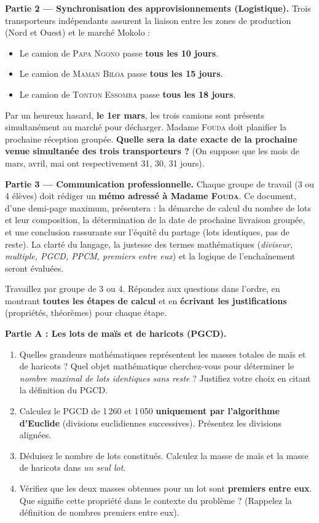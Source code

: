 \documentclass[11pt]{article}
\newcounter{popsec}
\newcounter{popsub}
\newcommand{\courssub}[1]{%
  \stepcounter{popsub}%
  \par\vspace{9pt}\noindent{\popxbold\fontsize{11.5}{13}\selectfont\color{popink}{\color{poporange}\thepopsec.\thepopsub}\hspace{6pt}#1}\par\nopagebreak\vspace{4pt}
}
\begin{document}
\medskip
\noindent \textbf{Partie 2 — Synchronisation des approvisionnements (Logistique).}
Trois transporteurs indépendants assurent la liaison entre les zones de production (Nord et Ouest) et le marché Mokolo :
\begin{itemize}
    \item Le camion de \textsc{Papa Ngono} passe \textbf{tous les 10 jours}.
    \item Le camion de \textsc{Maman Biloa} passe \textbf{tous les 15 jours}.
    \item Le camion de \textsc{Tonton Essomba} passe \textbf{tous les 18 jours}.
\end{itemize}
Par un heureux hasard, \textbf{le 1er mars}, les trois camions sont présents simultanément au marché pour décharger. Madame \textsc{Fouda} doit planifier la prochaine réception groupée. \textbf{Quelle sera la date exacte de la prochaine venue simultanée des trois transporteurs ?} (On suppose que les mois de mars, avril, mai ont respectivement 31, 30, 31 jours).

\medskip
\noindent \textbf{Partie 3 — Communication professionnelle.}
Chaque groupe de travail (3 ou 4 élèves) doit rédiger un \textbf{mémo adressé à Madame \textsc{Fouda}}. Ce document, d'une demi-page maximum, présentera : la démarche de calcul du nombre de lots et leur composition, la détermination de la date de prochaine livraison groupée, et une conclusion rassurante sur l'équité du partage (lots identiques, pas de reste). La clarté du langage, la justesse des termes mathématiques (\emph{diviseur, multiple, PGCD, PPCM, premiers entre eux}) et la logique de l'enchaînement seront évaluées.

\courssub{Consignes}
Travaillez par groupe de 3 ou 4. Répondez aux questions dans l'ordre, en montrant \textbf{toutes les étapes de calcul} et en \textbf{écrivant les justifications} (propriétés, théorèmes) pour chaque étape.

\medskip
\noindent \textbf{Partie A : Les lots de maïs et de haricots (PGCD).}
\begin{enumerate}
    \item Quelles grandeurs mathématiques représentent les masses totales de maïs et de haricots ? Quel objet mathématique cherchez-vous pour déterminer le \emph{nombre maximal de lots identiques sans reste} ? Justifiez votre choix en citant la définition du PGCD.
    \item Calculez le PGCD de 1\,260 et 1\,050 \textbf{uniquement par l'algorithme d'Euclide} (divisions euclidiennes successives). Présentez les divisions alignées.
    \item Déduisez le nombre de lots constitués. Calculez la masse de maïs et la masse de haricots dans \emph{un seul lot}.
    \item Vérifiez que les deux masses obtenues pour un lot sont \textbf{premiers entre eux}. Que signifie cette propriété dans le contexte du problème ? (Rappelez la définition de nombres premiers entre eux).
\end{enumerate}
\end{document}
